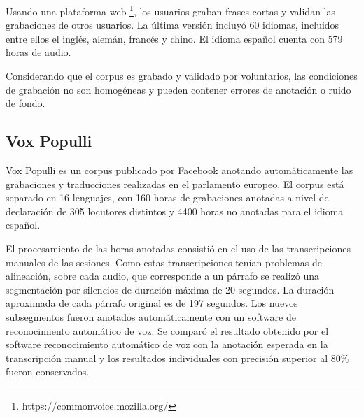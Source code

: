 Usando una plataforma web \footnote{https://commonvoice.mozilla.org/}, los usuarios graban frases cortas y validan las grabaciones de otros usuarios. La última versión  incluyó 60 idiomas, incluidos entre ellos el inglés, alemán, francés y chino. El idioma español cuenta con 579 horas de audio.

Considerando que el corpus es grabado y validado por voluntarios, las condiciones de grabación no son homogéneas y pueden contener errores de anotación o ruido de fondo.

\subsection{Vox Populli}

Vox Populli \cite{voxpopulli} es un corpus publicado por Facebook anotando automáticamente las grabaciones y traducciones realizadas en el parlamento europeo. El corpus está separado en 16 lenguajes, con 160 horas de grabaciones anotadas a nivel de declaración de 305 locutores distintos y 4400 horas no anotadas para el idioma español. 

El procesamiento de las horas anotadas consistió en el uso de las transcripciones manuales de las sesiones. Como estas transcripciones tenían problemas de alineación, sobre cada audio, que corresponde a un párrafo se realizó una segmentación por silencios de duración máxima de 20 segundos. La duración aproximada de cada párrafo original es de 197 segundos. Los nuevos subsegmentos fueron anotados automáticamente con un software de reconocimiento automático de voz. Se comparó el resultado obtenido por el software reconocimiento automático de voz con la anotación esperada en la transcripción manual y los resultados individuales con precisión superior al 80\% fueron conservados.